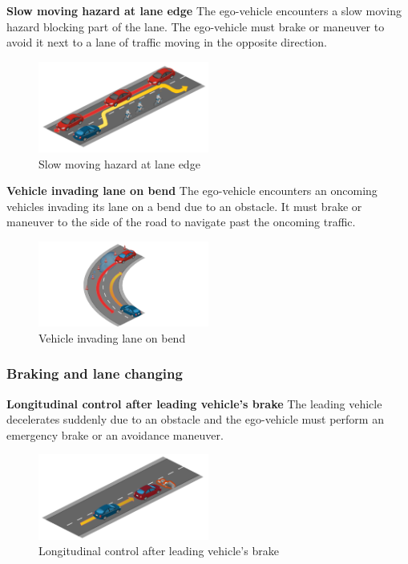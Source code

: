\documentclass{article}
\begin{document}
\textbf{Slow moving hazard at lane edge} 
The ego-vehicle encounters a slow moving hazard blocking part of the lane. The ego-vehicle must brake or maneuver to avoid it next to a lane of traffic 
moving in the opposite direction.
\begin{figure}[h]
    \centering
    \includegraphics[width=0.5\textwidth]{img/TR16a.png}
    \caption{Slow moving hazard at lane edge} \label{Scenario_slowMove}
\end{figure}

\textbf{Vehicle invading lane on bend} 
The ego-vehicle encounters an oncoming vehicles invading its lane on a bend due to an obstacle. It must brake or maneuver to the side of the road 
to navigate past the oncoming traffic.
\begin{figure}[h]
    \centering
    \includegraphics[width=0.5\textwidth]{img/TR22.png}
    \caption{Vehicle invading lane on bend} \label{Scenario_vehicleInvading}
\end{figure}

\subsubsection{Braking and lane changing}
\textbf{Longitudinal control after leading vehicle’s brake} 
The leading vehicle decelerates suddenly due to an obstacle and the ego-vehicle must perform an emergency brake or an avoidance maneuver.
\begin{figure}[h]
    \centering
    \includegraphics[width=0.5\textwidth]{img/TR02.png}
    \caption{Longitudinal control after leading vehicle’s brake} \label{Scenario_longgitudinalControl}
\end{figure}
\end{document}
